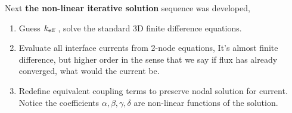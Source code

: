 \documentclass{school-22.211-notes}
\begin{document}
Next \textbf{the non-linear iterative solution} sequence was developed,
\begin{enumerate}
\item  Guess $\left. k_{\mathrm{eff}} \right.$, solve the standard 3D finite difference equations. 

\item Evaluate all interface currents from 2-node equations,
It's almost finite difference, but higher order in the sense that we say if flux has already converged, what would the current be. 

\item Redefine equivalent coupling terms to preserve nodal solution for current. Notice the coefficients $\alpha, \beta, \gamma, \delta$ are non-linear functions of the solution. 


\end{enumerate}
\end{document}
